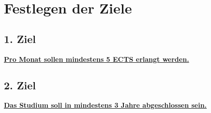 \section{Festlegen der Ziele}
\subsection{1. Ziel}

\underline{\textbf{Pro Monat sollen mindestens 5 ECTS erlangt werden.}}
\newline

\subsection{2. Ziel}

\underline{\textbf{Das Studium soll in mindestens 3 Jahre abgeschlossen sein.}}
\newline